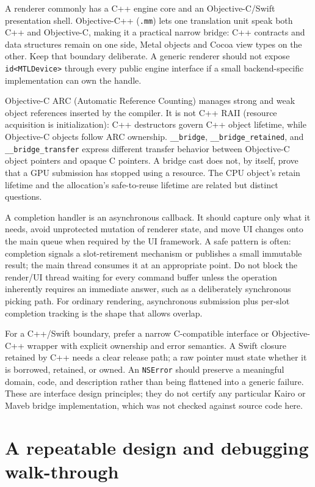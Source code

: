 A renderer commonly has a C++ engine core and an Objective-C/Swift presentation shell. Objective-C++ (\texttt{.mm}) lets one translation unit speak both C++ and Objective-C, making it a practical narrow bridge: C++ contracts and data structures remain on one side, Metal objects and Cocoa view types on the other. Keep that boundary deliberate. A generic renderer should not expose \texttt{id\textless{}MTLDevice\textgreater{}} through every public engine interface if a small backend-specific implementation can own the handle.

Objective-C ARC (Automatic Reference Counting) manages strong and weak object references inserted by the compiler. It is not C++ RAII (resource acquisition is initialization): C++ destructors govern C++ object lifetime, while Objective-C objects follow ARC ownership. \texttt{\_\_bridge}, \texttt{\_\_bridge\_retained}, and \texttt{\_\_bridge\_transfer} express different transfer behavior between Objective-C object pointers and opaque C pointers. A bridge cast does not, by itself, prove that a GPU submission has stopped using a resource. The CPU object's retain lifetime and the allocation's safe-to-reuse lifetime are related but distinct questions.

A completion handler is an asynchronous callback. It should capture only what it needs, avoid unprotected mutation of renderer state, and move UI changes onto the main queue when required by the UI framework. A safe pattern is often: completion signals a slot-retirement mechanism or publishes a small immutable result; the main thread consumes it at an appropriate point. Do not block the render/UI thread waiting for every command buffer unless the operation inherently requires an immediate answer, such as a deliberately synchronous picking path. For ordinary rendering, asynchronous submission plus per-slot completion tracking is the shape that allows overlap.

For a C++/Swift boundary, prefer a narrow C-compatible interface or Objective-C++ wrapper with explicit ownership and error semantics. A Swift closure retained by C++ needs a clear release path; a raw pointer must state whether it is borrowed, retained, or owned. An \texttt{NSError} should preserve a meaningful domain, code, and description rather than being flattened into a generic failure. These are interface design principles; they do not certify any particular Kairo or Maveb bridge implementation, which was not checked against source code here.

\section{A repeatable design and debugging walk-through}\label{01-foundations-i-ch011-a-repeatable-design-and-debugging-walk-through}

